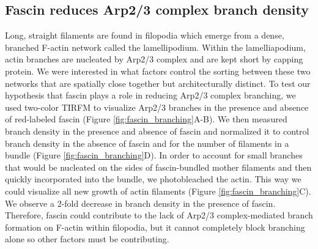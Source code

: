 \subsection{Fascin reduces Arp2/3 complex branch density}
Long, straight filaments are found in filopodia which emerge from a dense, branched F-actin network called the lamellipodium. Within the lamelliapodium, actin branches are nucleated by Arp2/3 complex and are kept short by capping protein. We were interested in what factors control the sorting between these two networks that are spatially close together but architecturally distinct. To test our hypothesis that fascin plays a role in reducing Arp2/3 complex branching, we used two-color TIRFM to visualize Arp2/3 branches in the presence and absence of red-labeled fascin (Figure \ref{fig:fascin_branching}A-B). We then measured branch density in the presence and absence of fascin and normalized it to control branch density in the absence of fascin and for the number of filaments in a bundle (Figure \ref{fig:fascin_branching}D). In order to account for small branches that would be nucleated on the sides of fascin-bundled mother filaments and then quickly incorporated into the bundle, we photobleached the actin. This way we could visualize all new growth of actin filaments (Figure \ref{fig:fascin_branching}C). We observe a 2-fold decrease in branch density in the presence of fascin. Therefore, fascin could contribute to the lack of Arp2/3 complex-mediated branch formation on F-actin within filopodia, but it cannot completely block branching alone so other factors must be contributing. 

